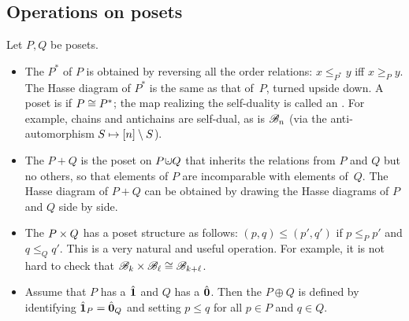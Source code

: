 \subsection{Operations on posets}

\begin{definition}
Let $P,Q$ be posets.
\begin{itemize}
\item
The  $P^*$ of $P$ is obtained by reversing all the order relations: $x\leq_{P^*}y$ iff $x\geq_Py$.  The Hasse diagram of $P^*$ is the same as that of~$P$, turned upside down.  A poset is  if $P\cong P^*$; the map realizing the self-duality is called an .  For example, chains and antichains are self-dual, as is $\mathscr{B}_n$ (via the anti-automorphism $S\mapsto[n]\setminus S$).
\item
The  $P+Q$ is the poset on $P\cdot\!\!\!\!\cup Q$ that inherits the relations from $P$ and $Q$ but no others, so that elements of $P$ are incomparable with elements of~$Q$.  The Hasse diagram of $P+Q$ can be obtained by drawing the Hasse diagrams of $P$ and $Q$ side by side.
\item
The  $P\times Q$ has a poset structure as follows: $(p,q)\leq(p',q')$ if $p\leq_Pp'$ and $q\leq_Qq'$.
This is a very natural and useful operation.  For example, it is not hard to check that $\mathscr{B}_k\times\mathscr{B}_{\ell}\cong\mathscr{B}_{k+\ell}$.
\item
Assume that $P$ has a $\hat{\mathbf{1}}$ and $Q$ has a $\hat{\mathbf{0}}$.  Then the  $P\oplus Q$ is defined by identifying $\hat{\mathbf{1}}_P=\hat{\mathbf{0}}_Q$ and setting $p\leq q$ for all $p\in P$ and $q\in Q$.
\end{itemize}
\end{definition}

